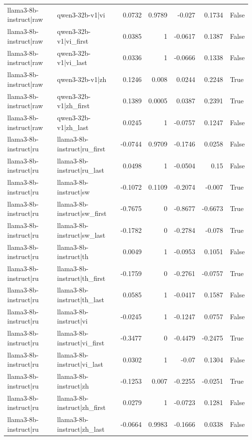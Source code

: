 \begin{table}
\begin{tabular}{l l r r r r l}
llama3-8b-instruct|raw & qwen3-32b-v1|vi & 0.0732 & 0.9789 & -0.027 & 0.1734 & False \\
llama3-8b-instruct|raw & qwen3-32b-v1|vi_first & 0.0385 & 1 & -0.0617 & 0.1387 & False \\
llama3-8b-instruct|raw & qwen3-32b-v1|vi_last & 0.0336 & 1 & -0.0666 & 0.1338 & False \\
llama3-8b-instruct|raw & qwen3-32b-v1|zh & 0.1246 & 0.008 & 0.0244 & 0.2248 & True \\
llama3-8b-instruct|raw & qwen3-32b-v1|zh_first & 0.1389 & 0.0005 & 0.0387 & 0.2391 & True \\
llama3-8b-instruct|raw & qwen3-32b-v1|zh_last & 0.0245 & 1 & -0.0757 & 0.1247 & False \\
llama3-8b-instruct|ru & llama3-8b-instruct|ru_first & -0.0744 & 0.9709 & -0.1746 & 0.0258 & False \\
llama3-8b-instruct|ru & llama3-8b-instruct|ru_last & 0.0498 & 1 & -0.0504 & 0.15 & False \\
llama3-8b-instruct|ru & llama3-8b-instruct|sw & -0.1072 & 0.1109 & -0.2074 & -0.007 & True \\
llama3-8b-instruct|ru & llama3-8b-instruct|sw_first & -0.7675 & 0 & -0.8677 & -0.6673 & True \\
llama3-8b-instruct|ru & llama3-8b-instruct|sw_last & -0.1782 & 0 & -0.2784 & -0.078 & True \\
llama3-8b-instruct|ru & llama3-8b-instruct|th & 0.0049 & 1 & -0.0953 & 0.1051 & False \\
llama3-8b-instruct|ru & llama3-8b-instruct|th_first & -0.1759 & 0 & -0.2761 & -0.0757 & True \\
llama3-8b-instruct|ru & llama3-8b-instruct|th_last & 0.0585 & 1 & -0.0417 & 0.1587 & False \\
llama3-8b-instruct|ru & llama3-8b-instruct|vi & -0.0245 & 1 & -0.1247 & 0.0757 & False \\
llama3-8b-instruct|ru & llama3-8b-instruct|vi_first & -0.3477 & 0 & -0.4479 & -0.2475 & True \\
llama3-8b-instruct|ru & llama3-8b-instruct|vi_last & 0.0302 & 1 & -0.07 & 0.1304 & False \\
llama3-8b-instruct|ru & llama3-8b-instruct|zh & -0.1253 & 0.007 & -0.2255 & -0.0251 & True \\
llama3-8b-instruct|ru & llama3-8b-instruct|zh_first & 0.0279 & 1 & -0.0723 & 0.1281 & False \\
llama3-8b-instruct|ru & llama3-8b-instruct|zh_last & -0.0664 & 0.9983 & -0.1666 & 0.0338 & False \\

\end{tabular}
\end{table}
